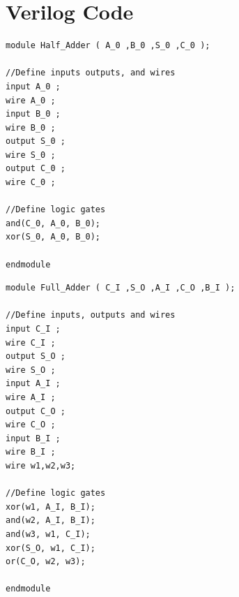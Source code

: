 \section{Verilog Code}
\label{appendix:Verilog-code}

\begin{lstlisting}[style=verilogStyle, caption=Half Adder in Verilog, label=verilog_halfadder]
module Half_Adder ( A_0 ,B_0 ,S_0 ,C_0 );

//Define inputs outputs, and wires
input A_0 ;
wire A_0 ;
input B_0 ;
wire B_0 ;
output S_0 ;
wire S_0 ;
output C_0 ;
wire C_0 ;

//Define logic gates
and(C_0, A_0, B_0);
xor(S_0, A_0, B_0);

endmodule
\end{lstlisting}


\begin{lstlisting}[style=verilogStyle, caption=Full Adder in Verilog, label=verilog_fulladder]
module Full_Adder ( C_I ,S_O ,A_I ,C_O ,B_I );

//Define inputs, outputs and wires
input C_I ;
wire C_I ;
output S_O ;
wire S_O ;
input A_I ;
wire A_I ;
output C_O ;
wire C_O ;
input B_I ;
wire B_I ;
wire w1,w2,w3;

//Define logic gates
xor(w1, A_I, B_I);
and(w2, A_I, B_I); 
and(w3, w1, C_I);
xor(S_O, w1, C_I);
or(C_O, w2, w3); 

endmodule
\end{lstlisting}


